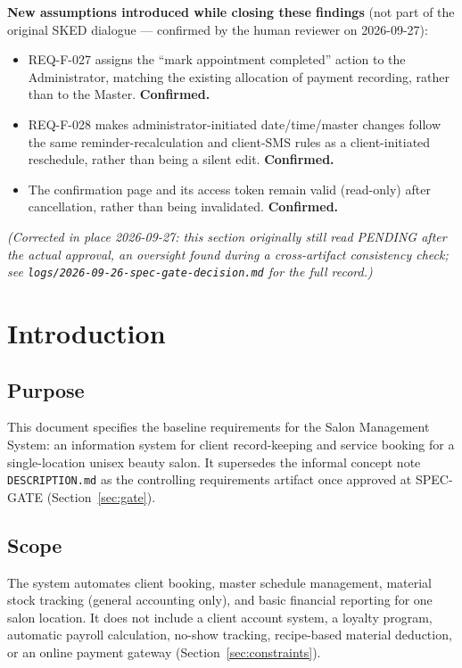 \documentclass[11pt,a4paper]{article}
\begin{document}
\medskip
\noindent\textbf{New assumptions introduced while closing these findings}
(not part of the original SKED dialogue --- confirmed by the human
reviewer on 2026-09-27):
\begin{itemize}[leftmargin=1.2cm]
  \item REQ-F-027 assigns the ``mark appointment completed'' action to the
    Administrator, matching the existing allocation of payment recording,
    rather than to the Master. \textbf{Confirmed.}
  \item REQ-F-028 makes administrator-initiated date/time/master changes
    follow the same reminder-recalculation and client-SMS rules as a
    client-initiated reschedule, rather than being a silent edit.
    \textbf{Confirmed.}
  \item The confirmation page and its access token remain valid
    (read-only) after cancellation, rather than being invalidated.
    \textbf{Confirmed.}
\end{itemize}
\emph{(Corrected in place 2026-09-27: this section originally still read
PENDING after the actual approval, an oversight found during a
cross-artifact consistency check; see
\texttt{logs/2026-09-26-spec-gate-decision.md} for the full record.)}

\tableofcontents
\newpage

\section{Introduction}

\subsection{Purpose}
This document specifies the baseline requirements for the Salon Management
System: an information system for client record-keeping and service booking
for a single-location unisex beauty salon. It supersedes the informal
concept note \texttt{DESCRIPTION.md} as the controlling requirements
artifact once approved at SPEC-GATE (Section~\ref{sec:gate}).

\subsection{Scope}
The system automates client booking, master schedule management, material
stock tracking (general accounting only), and basic financial reporting for
one salon location. It does not include a client account system, a loyalty
program, automatic payroll calculation, no-show tracking, recipe-based
material deduction, or an online payment gateway (Section~\ref{sec:constraints}).
\end{document}
